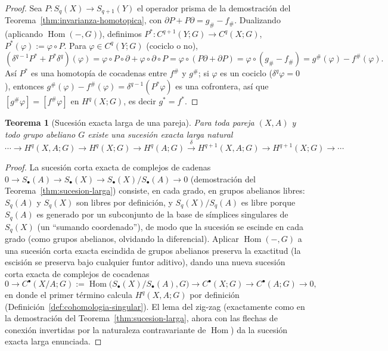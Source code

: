 \documentclass[11pt,a4paper]{article}
\theoremstyle{plain}
\newtheorem{theorem}{Teorema}[section]
\theoremstyle{definition}
\theoremstyle{remark}
\DeclareMathOperator{\Hom}{Hom}
\begin{document}
\begin{proof}
Sea $P:S_q(X)\to S_{q+1}(Y)$ el operador prisma de la demostración del
Teorema~\ref{thm:invarianza-homotopica}, con
$\partial P+P\partial=g_\#-f_\#$. Dualizando (aplicando $\Hom(-,G)$),
definimos $P^*:C^{q+1}(Y;G)\to C^q(X;G)$, $P^*(\varphi):=\varphi\circ P$.
Para $\varphi\in C^q(Y;G)$ (cociclo o no),
\[
(\delta^{q-1}P^*+P^*\delta^q)(\varphi)=\varphi\circ P\circ\partial+\varphi\circ\partial\circ P=\varphi\circ(P\partial+\partial P)=\varphi\circ(g_\#-f_\#)=g^\#(\varphi)-f^\#(\varphi).
\]
Así $P^*$ es una homotopía de cocadenas entre $f^\#$ y $g^\#$; si $\varphi$
es un cociclo ($\delta^q\varphi=0$), entonces
$g^\#(\varphi)-f^\#(\varphi)=\delta^{q-1}(P^*\varphi)$ es una cofrontera,
así que $[g^\#\varphi]=[f^\#\varphi]$ en $H^q(X;G)$, es decir
$g^*=f^*$.
\end{proof}

\begin{theorem}[Sucesión exacta larga de una pareja]
\label{thm:sucesion-larga-cohomologia}
Para toda pareja $(X,A)$ y todo grupo abeliano $G$ existe una sucesión
exacta larga natural
\[
\cdots\to H^q(X,A;G)\to H^q(X;G)\to H^q(A;G)\xrightarrow{\delta}H^{q+1}(X,A;G)\to H^{q+1}(X;G)\to\cdots
\]
\end{theorem}

\begin{proof}
La sucesión corta exacta de complejos de cadenas
$0\to S_\bullet(A)\to S_\bullet(X)\to S_\bullet(X)/S_\bullet(A)\to0$
(demostración del Teorema~\ref{thm:sucesion-larga}) consiste, en cada
grado, en grupos abelianos libres: $S_q(A)$ y $S_q(X)$ son libres por
definición, y $S_q(X)/S_q(A)$ es libre porque $S_q(A)$ es generado por un
subconjunto de la base de símplices singulares de $S_q(X)$ (un
``sumando coordenado''), de modo que la sucesión se escinde en cada
grado (como grupos abelianos, olvidando la diferencial). Aplicar
$\Hom(-,G)$ a una sucesión corta exacta escindida de grupos abelianos
preserva la exactitud (la escisión se preserva bajo cualquier funtor
aditivo), dando una nueva sucesión corta exacta de complejos de
cocadenas
\[
0\to C^\bullet(X/A;G):=\Hom\big(S_\bullet(X)/S_\bullet(A),G\big)\to C^\bullet(X;G)\to C^\bullet(A;G)\to0,
\]
en donde el primer término calcula $H^q(X,A;G)$ por definición
(Definición~\ref{def:cohomologia-singular}). El lema del zig-zag
(exactamente como en la demostración del Teorema~\ref{thm:sucesion-larga},
ahora con las flechas de conexión invertidas por la naturaleza
contravariante de $\Hom$) da la sucesión exacta larga enunciada.
\end{proof}
\end{document}
